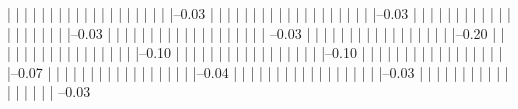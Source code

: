             |          |          |          |          |          |          |          |          |          |          
            |          |          |          |          |          |          |          |          |          |--0.03%
            |          |          |          |          |          |          |          |          |          |          
            |          |          |          |          |          |          |          |          |          |--0.03%
            |          |          |          |          |          |          |          |          |          |          
            |          |          |          |          |          |          |          |          |          |--0.03%
            |          |          |          |          |          |          |          |          |          |          
            |          |          |          |          |          |          |          |          |           --0.03%
            |          |          |          |          |          |          |          |          |          
            |          |          |          |          |          |          |          |          |--0.20%
            |          |          |          |          |          |          |          |          |          
            |          |          |          |          |          |          |          |          |--0.10%
            |          |          |          |          |          |          |          |          |          
            |          |          |          |          |          |          |          |          |--0.10%
            |          |          |          |          |          |          |          |          |          
            |          |          |          |          |          |          |          |          |--0.07%
            |          |          |          |          |          |          |          |          |          
            |          |          |          |          |          |          |          |          |--0.04%
            |          |          |          |          |          |          |          |          |          
            |          |          |          |          |          |          |          |          |--0.03%
            |          |          |          |          |          |          |          |          |          
            |          |          |          |          |          |          |          |           --0.03%
